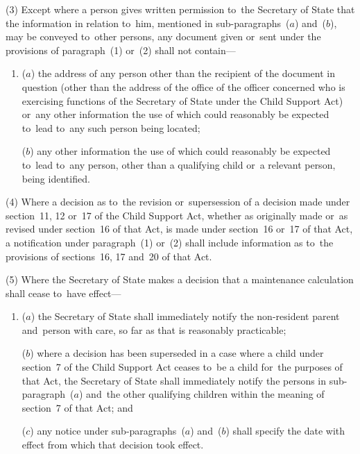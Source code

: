 \documentclass[12pt,a4paper]{article}
\begin{document}
(3) Except where a person gives written permission to~the 
Secretary of State  %
that the information in relation to~him, mentioned in sub-paragraphs~($a$)  and~($b$), may be conveyed to~other persons, any document given or~sent under the provisions of paragraph~(1) or~(2) shall not contain—
\begin{enumerate}\item[]
($a$) the address of any person other than the recipient of the document in question (other than the address of the office of the officer concerned who is exercising functions of the 
Secretary of State  %
under the Child Support Act) or~any other information the use of which could reasonably be expected to~lead to~any such person being located;

($b$) any other information the use of which could reasonably be expected to~lead to~any person, other than a qualifying child or~a relevant person, being identified.
\end{enumerate}

(4) Where a decision as to~the revision or~supersession of a decision made under section~11, 12 or~17 of the Child Support Act, whether as originally made or~as revised under section~16 of that Act, is made under section~16 or~17 of that Act, a notification under paragraph~(1) or~(2) shall include information as to~the provisions of sections~16, 17 and~20 of that Act.

(5) Where the 
Secretary of State  %
makes a decision that a maintenance calculation shall cease to~have effect—
\begin{enumerate}\item[]
($a$) 
the Secretary of State  %
shall immediately notify the non-resident parent and~person with care, so far as that is reasonably practicable;

($b$) where a decision has been superseded in a case where a child under section~7 of the Child Support Act ceases to~be a child for~the purposes of that Act, 
the Secretary of State  %
shall immediately notify the persons in sub-paragraph~($a$)  and~the other qualifying children within the meaning of section~7 of that Act; and

($c$) any notice under sub-paragraphs~($a$)  and~($b$)  shall specify the date with effect from which that decision took effect.
\end{enumerate}
\end{document}
